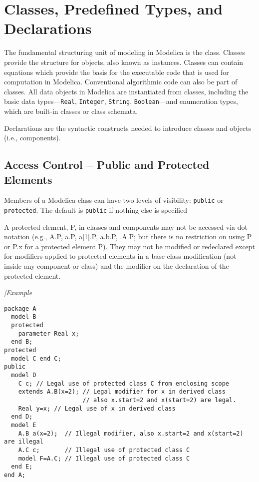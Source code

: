 \chapter{Classes, Predefined Types, and Declarations}

The fundamental structuring unit of modeling in Modelica is the class.
Classes provide the structure for objects, also known as instances.
Classes can contain equations which provide the basis for the executable
code that is used for computation in Modelica. Conventional algorithmic
code can also be part of classes. All data objects in Modelica are
instantiated from classes, including the basic data types---\lstinline!Real!,
\lstinline!Integer!, \lstinline!String!, \lstinline!Boolean!---and enumeration types, which are built-in
classes or class schemata.

Declarations are the syntactic constructs needed to introduce classes
and objects (i.e., components).

\section{Access Control -- Public and Protected Elements}

Members of a Modelica class can have two levels of visibility: \lstinline!public! or
\lstinline!protected!. The default is \lstinline!public! if nothing else is specified

A protected element, P, in classes and components may not be accessed
via dot notation (e.g., A.P, a.P, a{[}1{]}.P, a.b.P, .A.P; but there is
no restriction on using P or P.x for a protected element P). They may
not be modified or redeclared except for modifiers applied to protected
elements in a base-class modification (not inside any component or
class) and the modifier on the declaration of the protected element.

\emph{{[}Example}
\begin{lstlisting}[language=modelica]
package A
  model B
  protected
    parameter Real x;
  end B;
protected
  model C end C;
public
  model D
    C c; // Legal use of protected class C from enclosing scope
    extends A.B(x=2); // Legal modifier for x in derived class
                      // also x.start=2 and x(start=2) are legal.
    Real y=x; // Legal use of x in derived class
  end D;
  model E
    A.B a(x=2);  // Illegal modifier, also x.start=2 and x(start=2) are illegal
    A.C c;       // Illegal use of protected class C
    model F=A.C; // Illegal use of protected class C
  end E;
end A;
\end{lstlisting}

